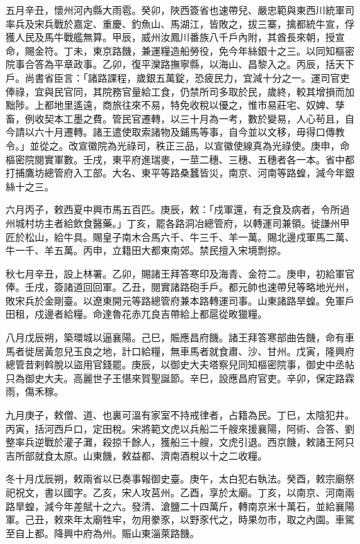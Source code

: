 \begin{pinyinscope}
 五月辛丑，懷州河內縣大雨雹。癸卯，陜西簽省也速帶兒、嚴忠範與東西川統軍司率兵及宋兵戰於嘉定、重慶、釣魚山、馬湖江，皆敗之，拔三寨，擒都統牛宣，俘獲人民及馬牛戰艦無算。甲辰，威州汝鳳川番族八千戶內附，其酋長來朝，授宣命，賜金符。丁未，東京路饑，兼運糧造船勞役，免今年絲銀十之三。以同知樞密院事合答為平章政事。乙卯，復平灤路撫寧縣，以海山、昌黎入之。丙辰，括天下戶。尚書省臣言：「諸路課程，歲銀五萬錠，恐疲民力，宜減十分之一。運司官吏俸祿，宜與民官同，其院務官量給工食，仍禁所司多取於民，歲終，較其增損而加黜陟。上都地里遙遠，商旅往來不易，特免收稅以優之，惟市易莊宅、奴婢、孳畜，例收契本工墨之費。管民官遷轉，以三十月為一考，數於變易，人心茍且，自今請以六十月遷轉。諸王遣使取索諸物及鋪馬等事，自今並以文移，毋得口傳教令。」並從之。改宣徽院為光祿司，秩正三品，以宣徽使線真為光祿使。庚申，命樞密院閱實軍數。壬戌，東平府進瑞麥，一莖二穗、三穗、五穗者各一本。省中都打捕鷹坊總管府入工部。大名、東平等路桑蠶皆災，南京、河南等路蝗，減今年銀絲十之三。



 六月丙子，敕西夏中興市馬五百匹。庚辰，敕：「戍軍還，有乏食及病者，令所過州城村坊主者給飲食醫藥。」丁亥，罷各路洞冶總管府，以轉運司兼領。徙謙州甲匠於松山，給牛具。賜皇子南木合馬六千、牛三千、羊一萬。賜北邊戍軍馬二萬、牛一千、羊五萬。丙申，立籍田大都東南郊。禁民擅入宋境剽掠。



 秋七月辛丑，設上林署。乙卯，賜諸王拜答寒印及海青、金符二。庚申，初給軍官俸。壬戌，簽諸道回回軍。乙丑，閱實諸路砲手戶。都元帥也速帶兒等略地光州，敗宋兵於金剛臺。以遼東開元等路總管府兼本路轉運司事。山東諸路旱蝗。免軍戶田租，戍邊者給糧。命達魯花赤兀良吉帶給上都扈從畋獵糧。



 八月戊辰朔，築環城以逼襄陽。己巳，賑應昌府饑。諸王拜答寒部曲告饑，命有車馬者徙居黃忽兒玉良之地，計口給糧，無車馬者就食肅、沙、甘州。戊寅，隆興府總管昔剌斡脫以盜用官錢罷。庚辰，以御史大夫塔察兒同知樞密院事，御史中丞帖只為御史大夫。高麗世子王愖來賀聖誕節。辛巳，設應昌府官吏。辛卯，保定路霖雨，傷禾稼。



 九月庚子，敕僧、道、也裏可溫有家室不持戒律者，占籍為民。丁巳，太陰犯井。丙寅，括河西戶口，定田稅。宋將範文虎以兵船二千艘來援襄陽，阿術、合答、劉整率兵逆戰於灌子灘，殺掠千餘人，獲船三十艘，文虎引退。西京饑，敕諸王阿只吉所部就食太原。山東饑，敕益都、濟南酒稅以十之二收糧。



 冬十月戊辰朔，敕兩省以已奏事報御史臺。庚午，太白犯右執法。癸酉，敕宗廟祭祀祝文，書以國字。乙亥，宋人攻莒州。乙酉，享於太廟。丁亥，以南京、河南兩路旱蝗，減今年差賦十之六。發清、滄鹽二十四萬斤，轉南京米十萬石，並給襄陽軍。己丑，敕來年太廟牲牢，勿用豢豕，以野豕代之，時果勿市，取之內園。車駕至自上都。降興中府為州。賑山東淄萊路饑。




\end{pinyinscope}
